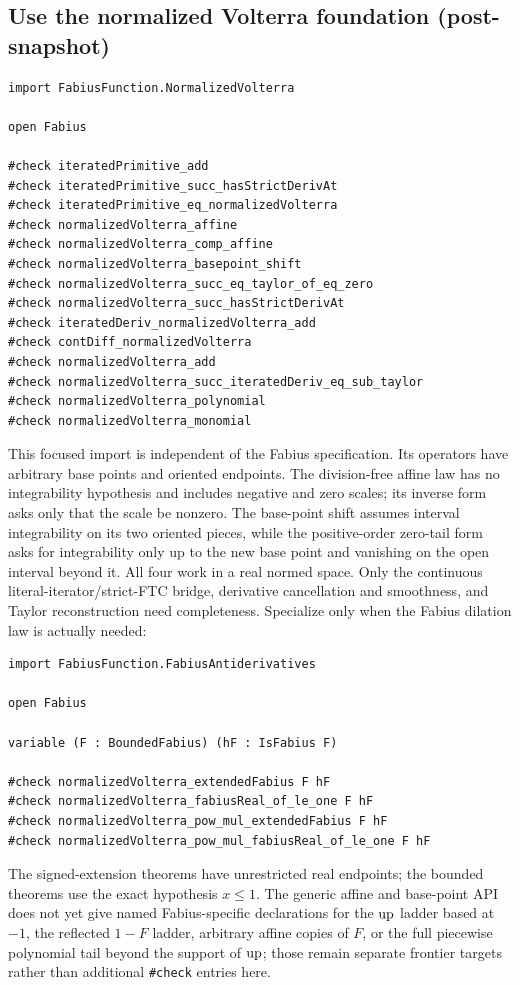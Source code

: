 \documentclass[11pt,oneside]{article}
\theoremstyle{definition}
\theoremstyle{remark}
\begin{document}
\subsection{Use the normalized Volterra foundation (post-snapshot)}
\begin{lstlisting}[style=pseudo]
import FabiusFunction.NormalizedVolterra

open Fabius

#check iteratedPrimitive_add
#check iteratedPrimitive_succ_hasStrictDerivAt
#check iteratedPrimitive_eq_normalizedVolterra
#check normalizedVolterra_affine
#check normalizedVolterra_comp_affine
#check normalizedVolterra_basepoint_shift
#check normalizedVolterra_succ_eq_taylor_of_eq_zero
#check normalizedVolterra_succ_hasStrictDerivAt
#check iteratedDeriv_normalizedVolterra_add
#check contDiff_normalizedVolterra
#check normalizedVolterra_add
#check normalizedVolterra_succ_iteratedDeriv_eq_sub_taylor
#check normalizedVolterra_polynomial
#check normalizedVolterra_monomial
\end{lstlisting}
This focused import is independent of the Fabius specification.  Its operators
have arbitrary base points and oriented endpoints.  The division-free affine
law has no integrability hypothesis and includes negative and zero scales; its
inverse form asks only that the scale be nonzero.  The base-point shift assumes
interval integrability on its two oriented pieces, while the positive-order
zero-tail form asks for integrability only up to the new base point and vanishing
on the open interval beyond it.  All four work in a real normed space.  Only the
continuous literal-iterator/strict-FTC bridge, derivative cancellation and
smoothness, and Taylor reconstruction need completeness.
Specialize only when the Fabius dilation
law is actually needed:
\begin{lstlisting}[style=pseudo]
import FabiusFunction.FabiusAntiderivatives

open Fabius

variable (F : BoundedFabius) (hF : IsFabius F)

#check normalizedVolterra_extendedFabius F hF
#check normalizedVolterra_fabiusReal_of_le_one F hF
#check normalizedVolterra_pow_mul_extendedFabius F hF
#check normalizedVolterra_pow_mul_fabiusReal_of_le_one F hF
\end{lstlisting}
The signed-extension theorems have unrestricted real endpoints; the bounded
theorems use the exact hypothesis \(x\le1\).  The generic affine and base-point
API does not yet give named Fabius-specific declarations for the \(\operatorname{up}\) ladder
based at \(-1\), the reflected \(1-F\) ladder, arbitrary affine copies of \(F\),
or the full piecewise polynomial tail beyond the support of \(\operatorname{up}\); those remain
separate frontier targets rather than additional \texttt{\#check} entries here.
\end{document}
